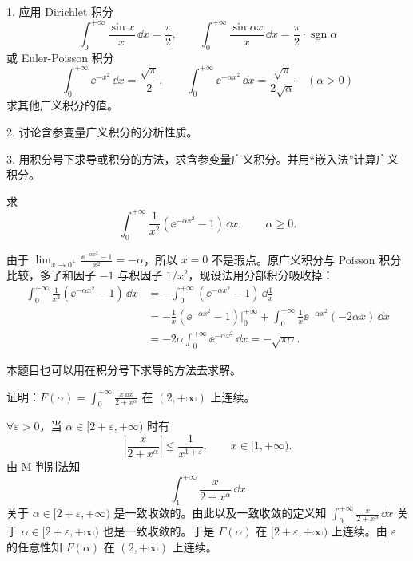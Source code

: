 1. 应用 Dirichlet 积分
\[
  \int_0^{+\infty}\frac{\sin x}{x}\,\dd x=\frac\pi2,
  \qquad
  \int_0^{+\infty}\frac{\sin\alpha x}{x}\,\dd x=\frac\pi2\cdot\operatorname{sgn}\alpha
\]
或 Euler-Poisson 积分
\[
  \int_0^{+\infty}\ee^{-x^2}\,\dd x=\frac{\sqrt\pi}{2},
  \qquad
  \int_0^{+\infty}\ee^{-\alpha x^2}\,\dd x=\frac{\sqrt\pi}{2\sqrt\alpha}\quad(\alpha>0)
\]
求其他广义积分的值。

2. 讨论含参变量广义积分的分析性质。

3. 用积分号下求导或积分的方法，求含参变量广义积分。并用“嵌入法”计算广义积分。

\begin{xexample}[23.2.5]
求
\[
  \int_0^{+\infty}\frac1{x^2}(\ee^{-\alpha x^2}-1)\,\dd x,
  \qquad \alpha\geqslant0.
\]
\end{xexample}
\begin{xsolution}
由于 $\displaystyle\lim_{x\to0^+}\frac{\ee^{-\alpha x^2}-1}{x^2}=-\alpha$，所以 $x=0$ 不是瑕点。原广义积分与 Poisson 积分比较，多了和因子 $-1$ 与积因子 $1/x^2$，现设法用分部积分吸收掉：
\[
\begin{aligned}
  \int_0^{+\infty}\frac1{x^2}(\ee^{-\alpha x^2}-1)\,\dd x
  &=-\int_0^{+\infty}(\ee^{-\alpha x^2}-1)\,\dd\frac1x\\
  &=-\frac1x(\ee^{-\alpha x^2}-1)\Big|_0^{+\infty}
    +\int_0^{+\infty}\frac1x\ee^{-\alpha x^2}(-2\alpha x)\,\dd x\\
  &=-2\alpha\int_0^{+\infty}\ee^{-\alpha x^2}\,\dd x=-\sqrt{\pi\alpha}.
\end{aligned}
\]
\end{xsolution}
\begin{xremark}
本题目也可以用在积分号下求导的方法去求解。
\end{xremark}

\begin{xexample}[23.2.6]
证明：$F(\alpha)=\displaystyle\int_0^{+\infty}\frac{x\,\dd x}{2+x^\alpha}$ 在 $(2,+\infty)$ 上连续。
\end{xexample}
\begin{xproof}
$\forall\varepsilon>0$，当 $\alpha\in[2+\varepsilon,+\infty)$ 时有
\begin{equation}
  \left|\frac{x}{2+x^\alpha}\right|\leqslant\frac1{x^{1+\varepsilon}},
  \qquad x\in[1,+\infty).
  \tag{23.5}
\end{equation}
由 M-判别法知
\begin{equation}
  \int_1^{+\infty}\frac{x}{2+x^\alpha}\,\dd x
  \tag{23.6}
\end{equation}
关于 $\alpha\in[2+\varepsilon,+\infty)$ 是一致收敛的。由此以及一致收敛的定义知 $\displaystyle\int_0^{+\infty}\frac{x}{2+x^\alpha}\,\dd x$ 关于 $\alpha\in[2+\varepsilon,+\infty)$ 也是一致收敛的。于是 $F(\alpha)$ 在 $[2+\varepsilon,+\infty)$ 上连续。由 $\varepsilon$ 的任意性知 $F(\alpha)$ 在 $(2,+\infty)$ 上连续。
\end{xproof}

